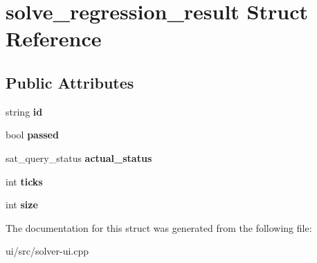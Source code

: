 \hypertarget{structsolve__regression__result}{\section{solve\-\_\-regression\-\_\-result \-Struct \-Reference}
\label{structsolve__regression__result}
}
\subsection*{\-Public \-Attributes}
\begin{DoxyCompactItemize}
\item 
\hypertarget{structsolve__regression__result_a480be46dbc7071cb7be8cdae59901232}{string {\bfseries id}}\label{structsolve__regression__result_a480be46dbc7071cb7be8cdae59901232}

\item 
\hypertarget{structsolve__regression__result_ac0e1326a67407d03d082d1c3a16525ba}{bool {\bfseries passed}}\label{structsolve__regression__result_ac0e1326a67407d03d082d1c3a16525ba}

\item 
\hypertarget{structsolve__regression__result_a9049726673e753b005dcf51ae88eb3f9}{sat\-\_\-query\-\_\-status {\bfseries actual\-\_\-status}}\label{structsolve__regression__result_a9049726673e753b005dcf51ae88eb3f9}

\item 
\hypertarget{structsolve__regression__result_a022003f6914899c873710d6dfcb9b1b4}{int {\bfseries ticks}}\label{structsolve__regression__result_a022003f6914899c873710d6dfcb9b1b4}

\item 
\hypertarget{structsolve__regression__result_a813c17519f64d4fc27b8c7490e146319}{int {\bfseries size}}\label{structsolve__regression__result_a813c17519f64d4fc27b8c7490e146319}

\end{DoxyCompactItemize}


\-The documentation for this struct was generated from the following file\-:\begin{DoxyCompactItemize}
\item 
ui/src/solver-\/ui.\-cpp\end{DoxyCompactItemize}

